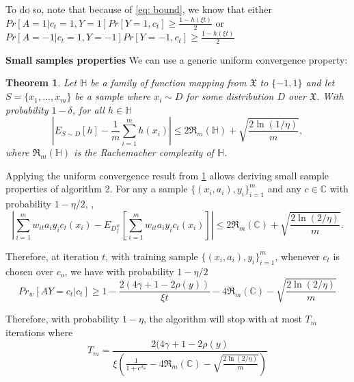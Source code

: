 \documentclass{article}
\newtheorem{thm}{Theorem}[section]
\begin{document}
\bigskip
To do so, note that because of \eqref{eq: bound}, we know that either $Pr[A=1|c_{t}=1, Y=1]Pr[Y=1, c_{t}]\geq \frac{1-h(\xi t)}{2}$ or $Pr[A=-1|c_{t}=1, Y=-1]Pr[Y=-1, c_{t}]\geq \frac{1-h(\xi t)}{2}$
 

\bigskip
\textbf{Small samples properties}
We can use a generic uniform convergence property: 

\begin{thm}
	\label{thm1}
	Let $\mathbb{H}$ be a family of function  mapping from $\mathfrak{X}$ to $\{-1, 1\}$ and let $S=\{x_{1}, ..., x_{m}\}$ be a sample where $x_{i}\sim D$ for some distribution $D$ over $\mathfrak{X}$. With probability $1-\delta$, for all $h\in \mathbb{H}$
	$$  \left|E_{S\sim D}[h]- \frac{1}{m}\displaystyle\sum_{i=1}^{m} h(x_{i})\right| \leq 2\mathfrak{R}_{m}(\mathbb{H}) + \sqrt{\frac{2\ln(1/\eta)}{m}},$$
	where $\mathfrak{R}_{m}(\mathbb{H})$ is the Rachemacher complexity of $\mathbb{H}$.
\end{thm}

Applying the uniform convergence result from \ref{thm1} allows deriving small sample properties of algorithm 2. For any a sample $\{(x_{i}, a_{i}), y_{i}\}_{i=1}^{m}$ and any $c\in \mathbb{C}$ with probability $1-\eta/2$, ,
\begin{equation}
\left|\displaystyle\sum_{i=1}^{m} w_{it}a_{i}y_{i}c_{t}(x_{i}) - E_{D_{f}^{w}}\left[\displaystyle\sum_{i=1}^{m} w_{it}a_{i}y_{i}c_{t}(x_{i})\right]\right| \leq 2\mathfrak{R}_{m}(\mathfrak{\mathbb{C}}) + \sqrt{\frac{2\ln(2/\eta)}{m}}.
\end{equation}

Therefore, at iteration $t$, with training sample $\{(x_{i}, a_{i}), y_{i}\}_{i=1}^{m}$,  whenever $c_{t}$ is chosen over $c_{o}$, we have with probability $1-\eta/2$
\begin{equation}
Pr_{w}[AY=c_{t}|c_{t}] \geq 1 - \frac{2(4\gamma + 1-2\rho(y))}{\xi t} - 4\mathfrak{R}_{m}(\mathfrak{\mathbb{C}}) - \sqrt{\frac{2\ln(2/\eta)}{m}}
\end{equation}

Therefore, with probability $1-\eta$, the algorithm will stop with at most $T_{m}$ iterations where
\begin{equation}
T_{m}= \frac{2(4\gamma + 1-2\rho(y)}{\xi\left(\frac{1}{1 + e^{\delta_{m}}} - 4\mathfrak{R}_{m}(\mathfrak{\mathbb{C}}) - \sqrt{\frac{2\ln(2/\eta)}{m}}\right)}
\end{equation}






\end{document}
